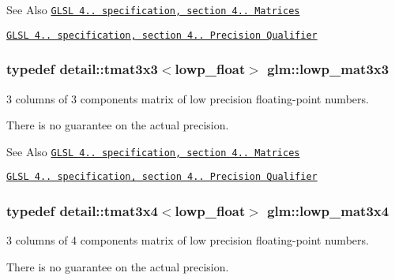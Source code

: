 \begin{DoxySeeAlso}{See Also}
\href{http://www.opengl.org/registry/doc/GLSLangSpec.4.20.8.pdf}{\tt G\-L\-S\-L 4.. specification, section 4.. Matrices} 

\href{http://www.opengl.org/registry/doc/GLSLangSpec.4.20.8.pdf}{\tt G\-L\-S\-L 4.. specification, section 4.. Precision Qualifier} 
\end{DoxySeeAlso}
\hypertarget{group__core__precision_gaf4dbe8a227cee5c02b5ab3faa0d948f5}{
\subsubsection[{lowp\-\_\-mat3x3}]{\setlength{\rightskip}{0pt plus 5cm}typedef detail\-::tmat3x3$<$lowp\-\_\-float$>$ {\bf glm\-::lowp\-\_\-mat3x3}}}\label{group__core__precision_gaf4dbe8a227cee5c02b5ab3faa0d948f5}


3 columns of 3 components matrix of low precision floating-\/point numbers. 

There is no guarantee on the actual precision.

\begin{DoxySeeAlso}{See Also}
\href{http://www.opengl.org/registry/doc/GLSLangSpec.4.20.8.pdf}{\tt G\-L\-S\-L 4.. specification, section 4.. Matrices} 

\href{http://www.opengl.org/registry/doc/GLSLangSpec.4.20.8.pdf}{\tt G\-L\-S\-L 4.. specification, section 4.. Precision Qualifier} 
\end{DoxySeeAlso}
\hypertarget{group__core__precision_ga1b202ac2d7cea4f30ad802471f6081ac}{
\subsubsection[{lowp\-\_\-mat3x4}]{\setlength{\rightskip}{0pt plus 5cm}typedef detail\-::tmat3x4$<$lowp\-\_\-float$>$ {\bf glm\-::lowp\-\_\-mat3x4}}}\label{group__core__precision_ga1b202ac2d7cea4f30ad802471f6081ac}


3 columns of 4 components matrix of low precision floating-\/point numbers. 

There is no guarantee on the actual precision.

